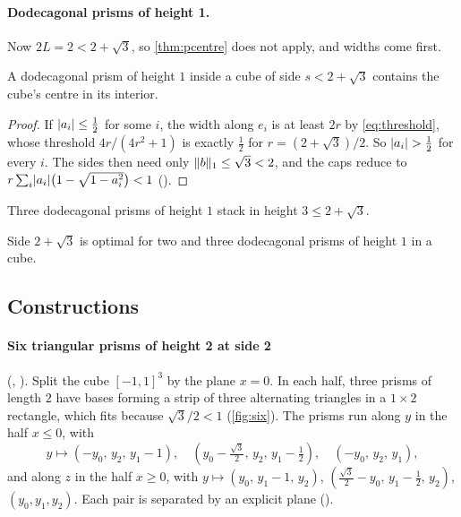 \documentclass[11pt,a4paper]{article}
\begin{document}
\paragraph{Dodecagonal prisms of height 1.} Now $2L=2<2+\sqrt3$, so \cref{thm:pcentre} does not apply, and widths come first.

\begin{theorem}
A dodecagonal prism of height $1$ inside a cube of side $s<2+\sqrt3$ contains the cube's centre in its interior.
\end{theorem}
\begin{proof}
If $\lvert a_i\rvert\le\tfrac12$ for some $i$, the width along $e_i$ is at least $2r$ by \eqref{eq:threshold}, whose threshold $4r/(4r^2+1)$ is exactly $\tfrac12$ for $r=(2+\sqrt3)/2$. So $\lvert a_i\rvert>\tfrac12$ for every $i$. The sides then need only $\lVert b\rVert_1\le\sqrt3<2$, and the caps reduce to $r\sum_i\lvert a_i\rvert\bigl(1-\sqrt{1-a_i^2}\bigr)<1$ ().
\end{proof}

Three dodecagonal prisms of height $1$ stack in height $3\le2+\sqrt3$.

\begin{theorem}
Side $2+\sqrt3$ is optimal for two and three dodecagonal prisms of height $1$ in a cube.
\end{theorem}

\subsection{Constructions}\label{sec:constructions}

\paragraph{Six triangular prisms of height 2 at side 2} (, ). Split the cube $[-1,1]^3$ by the plane $x=0$. In each half, three prisms of length $2$ have bases forming a strip of three alternating triangles in a $1\times2$ rectangle, which fits because $\sqrt3/2<1$ (\cref{fig:six}). The prisms run along $y$ in the half $x\le0$, with
\[
y\mapsto(-y_0,\,y_2,\,y_1-1),\quad(y_0-\tfrac{\sqrt3}2,\,y_2,\,y_1-\tfrac12),\quad(-y_0,\,y_2,\,y_1),
\]
and along $z$ in the half $x\ge0$, with $y\mapsto(y_0,\,y_1-1,\,y_2)$, $(\tfrac{\sqrt3}2-y_0,\,y_1-\tfrac12,\,y_2)$, $(y_0,y_1,y_2)$. Each pair is separated by an explicit plane ().
\end{document}
